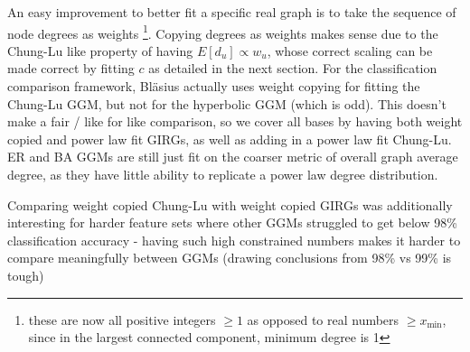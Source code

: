 
An easy improvement to better fit a specific real graph is to take the sequence of node degrees as weights
\footnote{these are now all positive integers $\geq 1$ as opposed to real numbers $\geq x_{\min}$, since in the largest connected component, minimum degree is 1}. Copying degrees as weights makes sense due to the Chung-Lu like property of having $E[d_u] \propto w_u$, whose correct scaling can be made correct by fitting $c$ as detailed in the next section. 
For the classification comparison framework, Bl{\"a}sius actually uses weight copying for fitting the Chung-Lu GGM, but not for the hyperbolic GGM (which is odd). This doesn't make a fair / like for like comparison, so we cover all bases by having both weight copied and power law fit GIRGs, as well as adding in a power law fit Chung-Lu. ER and BA GGMs are still just fit on the coarser metric of overall graph average degree, as they have little ability to replicate a power law degree distribution.

Comparing weight copied Chung-Lu with weight copied GIRGs was additionally interesting for harder feature sets where other GGMs struggled to get below 98\% classification accuracy - having such high constrained numbers makes it harder to compare meaningfully between GGMs (drawing conclusions from 98\% vs 99\% is tough)




